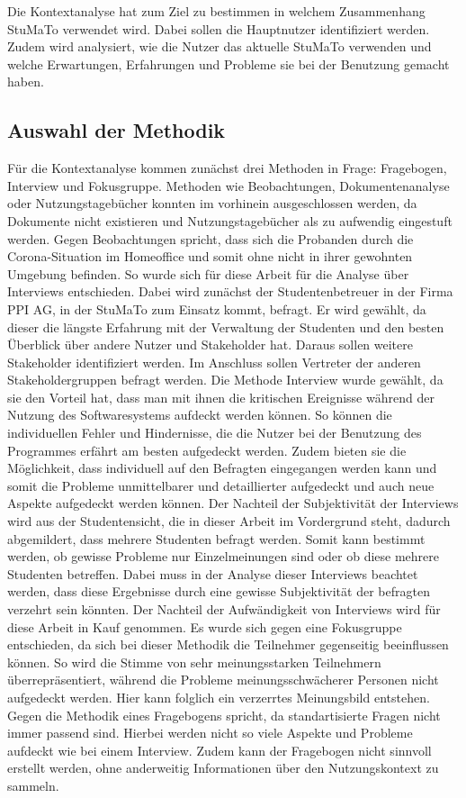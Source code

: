 \documentclass[
  12pt,
  ngerman,
  a4paper,
]{article}
\begin{document}
Die Kontextanalyse hat zum Ziel zu bestimmen in welchem Zusammenhang
StuMaTo verwendet wird. Dabei sollen die Hauptnutzer identifiziert
werden. Zudem wird analysiert, wie die Nutzer das aktuelle StuMaTo
verwenden und welche Erwartungen, Erfahrungen und Probleme sie bei der
Benutzung gemacht haben.

\hypertarget{auswahl-der-methodik}{%
\subsection{Auswahl der Methodik}\label{auswahl-der-methodik}}

Für die Kontextanalyse kommen zunächst drei Methoden in Frage:
Fragebogen, Interview und Fokusgruppe. Methoden wie Beobachtungen,
Dokumentenanalyse oder Nutzungstagebücher konnten im vorhinein
ausgeschlossen werden, da Dokumente nicht existieren und
Nutzungstagebücher als zu aufwendig eingestuft werden. Gegen
Beobachtungen spricht, dass sich die Probanden durch die
Corona-Situation im Homeoffice und somit ohne nicht in ihrer gewohnten
Umgebung befinden. So wurde sich für diese Arbeit für die Analyse über
Interviews entschieden. Dabei wird zunächst der Studentenbetreuer in der
Firma PPI AG, in der StuMaTo zum Einsatz kommt, befragt. Er wird
gewählt, da dieser die längste Erfahrung mit der Verwaltung der
Studenten und den besten Überblick über andere Nutzer und Stakeholder
hat. Daraus sollen weitere Stakeholder identifiziert werden. Im
Anschluss sollen Vertreter der anderen Stakeholdergruppen befragt
werden. Die Methode Interview wurde gewählt, da sie den Vorteil hat,
dass man mit ihnen die kritischen Ereignisse während der Nutzung des
Softwaresystems aufdeckt werden können. So können die individuellen
Fehler und Hindernisse, die die Nutzer bei der Benutzung des Programmes
erfährt am besten aufgedeckt werden. Zudem bieten sie die Möglichkeit,
dass individuell auf den Befragten eingegangen werden kann und somit die
Probleme unmittelbarer und detaillierter aufgedeckt und auch neue
Aspekte aufgedeckt werden können. Der Nachteil der Subjektivität der
Interviews wird aus der Studentensicht, die in dieser Arbeit im
Vordergrund steht, dadurch abgemildert, dass mehrere Studenten befragt
werden. Somit kann bestimmt werden, ob gewisse Probleme nur
Einzelmeinungen sind oder ob diese mehrere Studenten betreffen. Dabei
muss in der Analyse dieser Interviews beachtet werden, dass diese
Ergebnisse durch eine gewisse Subjektivität der befragten verzehrt sein
könnten. Der Nachteil der Aufwändigkeit von Interviews wird für diese
Arbeit in Kauf genommen. Es wurde sich gegen eine Fokusgruppe
entschieden, da sich bei dieser Methodik die Teilnehmer gegenseitig
beeinflussen können. So wird die Stimme von sehr meinungsstarken
Teilnehmern überrepräsentiert, während die Probleme meinungsschwächerer
Personen nicht aufgedeckt werden. Hier kann folglich ein verzerrtes
Meinungsbild entstehen. Gegen die Methodik eines Fragebogens spricht, da
standartisierte Fragen nicht immer passend sind. Hierbei werden nicht so
viele Aspekte und Probleme aufdeckt wie bei einem Interview. Zudem kann
der Fragebogen nicht sinnvoll erstellt werden, ohne anderweitig
Informationen über den Nutzungskontext zu sammeln.
\end{document}
